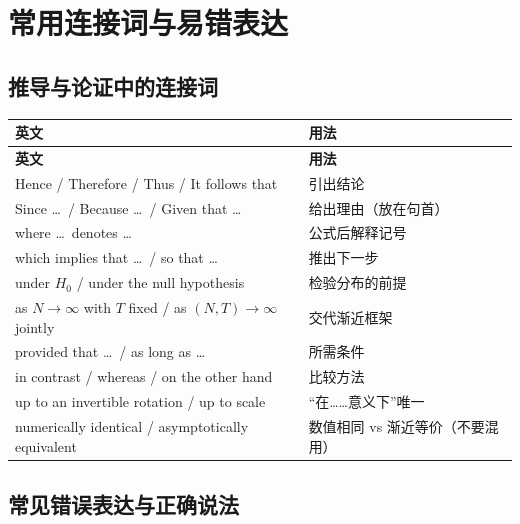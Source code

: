 \section{常用连接词与易错表达}\label{sec:UappC-phrases}

\subsection{推导与论证中的连接词}

{\renewcommand{\arraystretch}{1.15}\begin{longtable}{@{}>{\raggedright\arraybackslash}p{9.6cm}>{\raggedright\arraybackslash\small}p{6.1cm}@{}}
\toprule
\textbf{英文} & \textbf{用法}\\
\midrule
\endfirsthead
\toprule
\textbf{英文} & \textbf{用法}\\
\midrule
\endhead
\bottomrule
\endlastfoot
Hence / Therefore / Thus / It follows that & 引出结论\\
\addlinespace[2pt]
Since \ldots\ / Because \ldots\ / Given that \ldots & 给出理由（放在句首）\\
\addlinespace[2pt]
where \ldots\ denotes \ldots & 公式后解释记号\\
\addlinespace[2pt]
which implies that \ldots\ / so that \ldots & 推出下一步\\
\addlinespace[2pt]
under $H_0$ / under the null hypothesis & 检验分布的前提\\
\addlinespace[2pt]
as $N\to\infty$ with $T$ fixed / as $(N,T)\to\infty$ jointly & 交代渐近框架\\
\addlinespace[2pt]
provided that \ldots\ / as long as \ldots & 所需条件\\
\addlinespace[2pt]
in contrast / whereas / on the other hand & 比较方法\\
\addlinespace[2pt]
up to an invertible rotation / up to scale & “在……意义下”唯一\\
\addlinespace[2pt]
numerically identical / asymptotically equivalent & 数值相同 vs 渐近等价（不要混用）\\
\end{longtable}}


\subsection{常见错误表达与正确说法}

